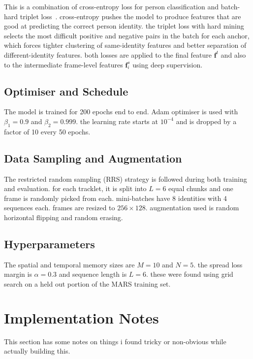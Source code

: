 \documentclass[conference]{IEEEtran}
\begin{document}
This is a combination of cross-entropy loss for person classification and batch-hard triplet loss~\cite{hermans2017triplet}. cross-entropy pushes the model to produce features that are good at predicting the correct person identity. the triplet loss with hard mining selects the most difficult positive and negative pairs in the batch for each anchor, which forces tighter clustering of same-identity features and better separation of different-identity features. both losses are applied to the final feature $\mathbf{f}^t$ and also to the intermediate frame-level features $\mathbf{f}^s_i$ using deep supervision.

\subsection{Optimiser and Schedule}

The model is trained for 200 epochs end to end. Adam optimiser is used with $\beta_1 = 0.9$ and $\beta_2 = 0.999$. the learning rate starts at $10^{-4}$ and is dropped by a factor of 10 every 50 epochs.

\subsection{Data Sampling and Augmentation}

The restricted random sampling (RRS) strategy is followed during both training and evaluation. for each tracklet, it is split into $L = 6$ equal chunks and one frame is randomly picked from each. mini-batches have 8 identities with 4 sequences each. frames are resized to $256 \times 128$. augmentation used is random horizontal flipping and random erasing.

\subsection{Hyperparameters}

The spatial and temporal memory sizes are $M = 10$ and $N = 5$. the spread loss margin is $\alpha = 0.3$ and sequence length is $L = 6$. these were found using grid search on a held out portion of the MARS training set.

\section{Implementation Notes}
\label{sec:impl}

This section has some notes on things i found tricky or non-obvious while actually building this.
\end{document}
